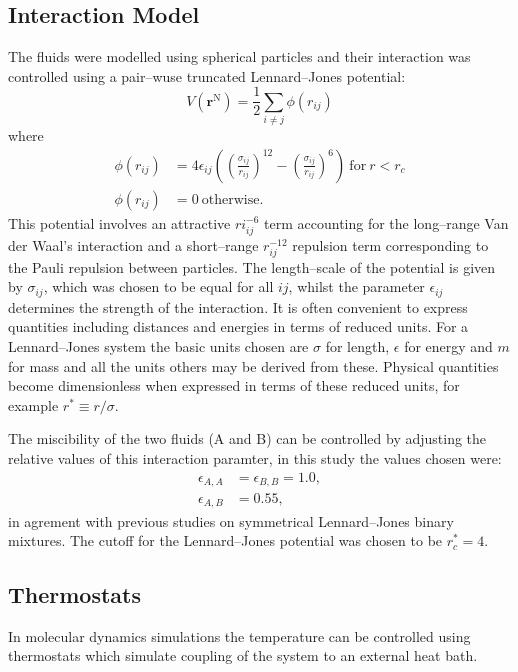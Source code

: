 \subsection{Interaction Model}\label{InteractionModel}
The fluids were modelled using spherical particles and their interaction was controlled using a pair--wuse truncated Lennard--Jones potential:
\begin{equation}
V \left( \mathbf{r}^{\mathrm{N}} \right) = \frac{1}{2} \sum_{i\neq j} \phi \left( r_{ij} \right)
\end{equation}
where
\begin{align}
\label{LJ}
\phi \left( r_{ij} \right) &= 4 \epsilon_{ij} \left( \left( \frac{\sigma_{ij}}{r_{ij}}\right)^{12} - \left( \frac{\sigma_{ij}}{r_{ij}}\right)^{6} \right)\ \mathrm{for}\ r < r_{c}\\
\phi \left( r_{ij} \right) &= 0\ \mathrm{otherwise}.
\end{align}
This potential involves an attractive $ri_{ij}^{-6}$ term accounting for the long--range Van der Waal's interaction and a short--range $r_{ij}^{-12}$ repulsion term corresponding to the Pauli repulsion between particles.
The length--scale of the potential is given by $\sigma_{ij}$, which was chosen to be equal for all $ij$, whilst the parameter $\epsilon_{ij}$ determines the strength of the interaction. 
It is often convenient to express quantities including distances and energies in terms of reduced units.
For a Lennard--Jones system the basic units chosen are $\sigma$ for length, $\epsilon$ for energy and $m$ for mass and all the units others may be derived from these.\cite{FrenkelSmit}
Physical quantities become dimensionless when expressed in terms of these reduced units, for example $r^{*} \equiv r / \sigma$.

The miscibility of the two fluids (A and B) can be controlled by adjusting the relative values of this interaction paramter, in this study the values chosen were:
\begin{align}
\epsilon_{A,A} &= \epsilon_{B,B} = 1.0,\\
\epsilon_{A,B} &= 0.55,
\end{align}
in agrement with previous studies on symmetrical Lennard--Jones binary mixtures.\cite{MorenzoRazo,Blas,HolgerBoppHampe}
The cutoff for the Lennard--Jones potential was chosen to be $r_{c}^{*} = 4$.

\subsection{Thermostats}
In molecular dynamics simulations the temperature can be controlled using thermostats which simulate coupling of the system to an external heat bath.


